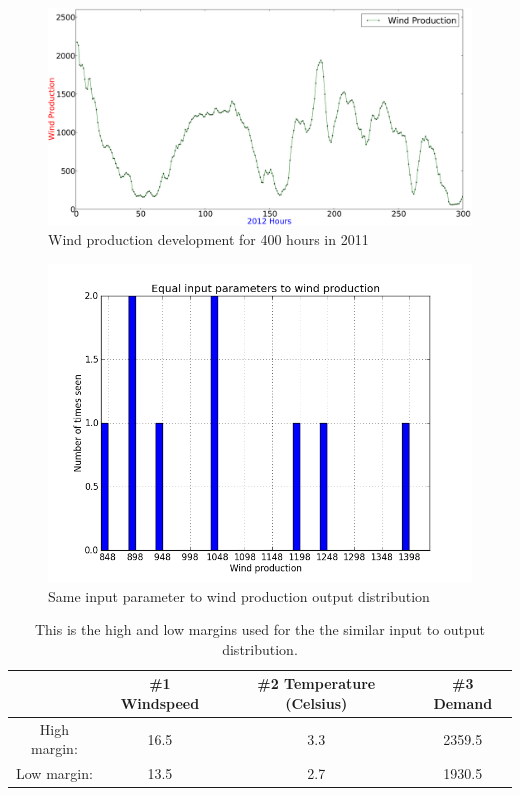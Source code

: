 \begin{figure}[H]
\centering
\includegraphics[width=0.99\linewidth,natwidth=898,natheight=587]{billeder/productionTendency400Hours.png}
\caption{Wind production development for 400 hours in 2011}
\label{fig:windHourDevelopment400Hours}
\end{figure}

\begin{figure}[H]
\centering
\includegraphics[width=0.99\linewidth,natwidth=898,natheight=587]{billeder/Equal_wind.png}
\caption{Same input parameter to wind production output distribution}
\label{fig:inputParameterDistribution}
\end{figure}

\begin{table}[H]
\centering  %
\begin{tabular}{c c c c} %
 & \#1 Windspeed & \#2 Temperature (Celsius) & \#3 Demand \\ [0.5ex] %
\hline                  %
High margin: & 16.5 & 3.3 & 2359.5  \\
Low margin: & 13.5 & 2.7 & 1930.5 \\ [1ex] %
\hline %
\end{tabular}
\caption{This is the high and low margins used for the the similar input to output distribution.} %
\label{table:similarHoursLimitsWindProd} %
\end{table}

